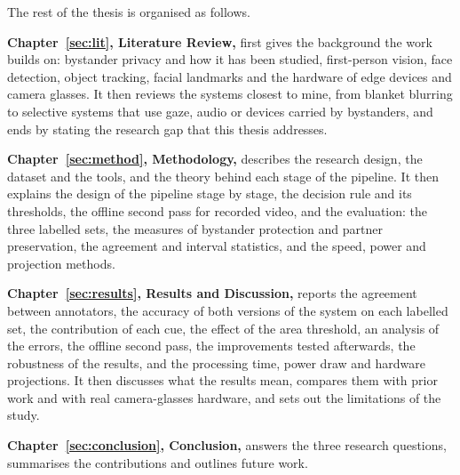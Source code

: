 The rest of the thesis is organised as follows.

\textbf{Chapter~\ref{sec:lit}, Literature Review,} first gives the background the work
builds on: bystander privacy and how it has been studied, first-person vision, face
detection, object tracking, facial landmarks and the hardware of edge devices and camera
glasses. It then reviews the systems closest to mine, from blanket blurring to selective
systems that use gaze, audio or devices carried by bystanders, and ends by stating the
research gap that this thesis addresses.

\textbf{Chapter~\ref{sec:method}, Methodology,} describes the research design, the
dataset and the tools, and the theory behind each stage of the pipeline. It then explains
the design of the pipeline stage by stage, the decision rule and its thresholds, the
offline second pass for recorded video, and the evaluation: the three labelled sets, the
measures of bystander protection and partner preservation, the agreement and interval
statistics, and the speed, power and projection methods.

\textbf{Chapter~\ref{sec:results}, Results and Discussion,} reports the agreement between
annotators, the accuracy of both versions of the system on each labelled set, the
contribution of each cue, the effect of the area threshold, an analysis of the errors,
the offline second pass, the improvements tested afterwards, the robustness of the
results, and the processing time, power draw and hardware projections. It then discusses
what the results mean, compares them with prior work and with real camera-glasses
hardware, and sets out the limitations of the study.

\textbf{Chapter~\ref{sec:conclusion}, Conclusion,} answers the three research questions,
summarises the contributions and outlines future work.

